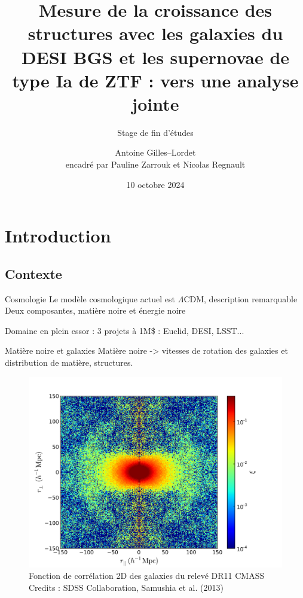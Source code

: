 \documentclass{beamer}
\title[Mesure de la croissance des structures avec DESI et ZTF]{Mesure de la croissance des structures avec les galaxies du DESI BGS et les supernovae de type Ia de ZTF : vers une analyse jointe}
\subtitle{Stage de fin d'études}
\author[Antoine Gilles--Lordet]{Antoine Gilles--Lordet \\ \footnotesize encadré par Pauline Zarrouk et Nicolas Regnault}
\date{10 octobre 2024}
\newcommand{\credits}[1]{\tiny Credits : #1}
\begin{document}
\frame{\titlepage}

\begin{frame}
	\tableofcontents
\end{frame}

\section{Introduction}

\subsection{Contexte}


\begin{frame}{Cosmologie}
	Le modèle cosmologique actuel est $\Lambda$CDM, description remarquable
	Deux composantes, matière noire et énergie noire

	Domaine en plein essor : 3 projets à 1M\$ : Euclid, DESI, LSST... 	
\end{frame}

\begin{frame}{Matière noire et galaxies}
	Matière noire -> vitesses de rotation des galaxies et distribution de matière, structures.
	\begin{figure}
		\centering
		\includegraphics[height=0.5\textheight]{figures/FoG.png}
		\caption{Fonction de corrélation 2D des galaxies du relevé DR11 CMASS\\ \credits{SDSS Collaboration, Samushia et al. (2013)}}
	\end{figure}
\end{frame}
\end{document}
